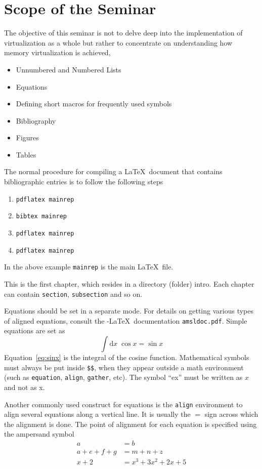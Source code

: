 \section{Scope of the Seminar}
The objective of this seminar is not to delve deep into the implementation of virtualization as a whole but rather to concentrate on understanding how memory virtualization is achieved,  
\begin{itemize}
\item Unnumbered and Numbered Lists
\item Equations
\item Defining short macros for frequently used symbols
\item Bibliography
\item Figures
\item Tables
\end{itemize}

The normal procedure for compiling a \LaTeX\ document that contains
bibliographic entries is to follow the following steps
\begin{enumerate}
\item \verb|pdflatex mainrep|
\item \verb|bibtex mainrep|
\item \verb|pdflatex mainrep|
\item \verb|pdflatex mainrep|
\end{enumerate}
In the above example \verb|mainrep| is the main \LaTeX\ file.




This is the first chapter, which resides in a directory (folder)
intro. Each chapter can contain \verb|section|, \verb|subsection|
and so on.




Equations should be set in a separate mode.  For details on getting
various types of aligned equations, consult the \AmS-\LaTeX\
documentation \verb|amsldoc.pdf|. Simple equations are set as
\begin{equation}
\label{eq:sinx}
\int \mathrm{d}x \; \cos x =  \sin x
\end{equation}
Equation~\eqref{eq:sinx} is the integral of the cosine
function. Mathematical symbols must always be put inside \verb|$$|,
when they appear outside a math environment (such as \verb|equation|,
\verb|align|, \verb|gather|, etc).  The symbol ``ex'' must be written as
$x$ and not as x.  

Another commonly used construct for equations is the \verb|align|
environment to align several equations along a vertical line. It is
usually the $=$ sign across which the alignment is done.  The
point of alignment for each equation is specified using the ampersand symbol 
\begin{align}
a &= b  \\
a + e + f + g & = m + n + z \\
x + 2 & = x^{3} + 3 x^{2} + 2 x + 5
\end{align}

